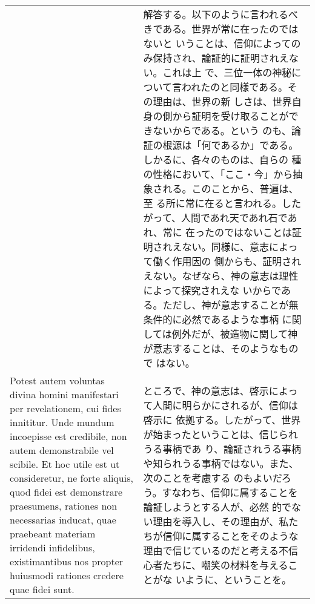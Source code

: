 \documentclass[10pt]{jsarticle} %
\begin{document}
\begin{longtable}{p{21em}p{21em}}
&

解答する。以下のように言われるべきである。世界が常に在ったのではないと
いうことは、信仰によってのみ保持され、論証的に証明されえない。これは上
で、三位一体の神秘について言われたのと同様である。その理由は、世界の新
しさは、世界自身の側から証明を受け取ることができないからである。という
のも、論証の根源は「何であるか」である。しかるに、各々のものは、自らの
種の性格において、「ここ・今」から抽象される。このことから、普遍は、至
る所に常に在ると言われる。したがって、人間であれ天であれ石であれ、常に
在ったのではないことは証明されえない。同様に、意志によって働く作用因の
側からも、証明されえない。なぜなら、神の意志は理性によって探究されえな
いからである。ただし、神が意志することが無条件的に必然であるような事柄
に関しては例外だが、被造物に関して神が意志することは、そのようなもので
はない。

\\


Potest autem voluntas divina
 homini manifestari per revelationem, cui fides innititur. Unde mundum
 incoepisse est credibile, non autem demonstrabile vel scibile. Et hoc
 utile est ut consideretur, ne forte aliquis, quod fidei est demonstrare
 praesumens, rationes non necessarias inducat, quae praebeant materiam
 irridendi infidelibus, existimantibus nos propter huiusmodi rationes
 credere quae fidei sunt.
&

ところで、神の意志は、啓示によって人間に明らかにされるが、信仰は啓示に
依拠する。したがって、世界が始まったということは、信じられうる事柄であ
り、論証されうる事柄や知られうる事柄ではない。また、次のことを考慮する
のもよいだろう。すなわち、信仰に属することを論証しようとする人が、必然
的でない理由を導入し、その理由が、私たちが信仰に属することをそのような
理由で信じているのだと考える不信心者たちに、嘲笑の材料を与えることがな
いように、ということを。

\\



\end{longtable}
\end{document}
